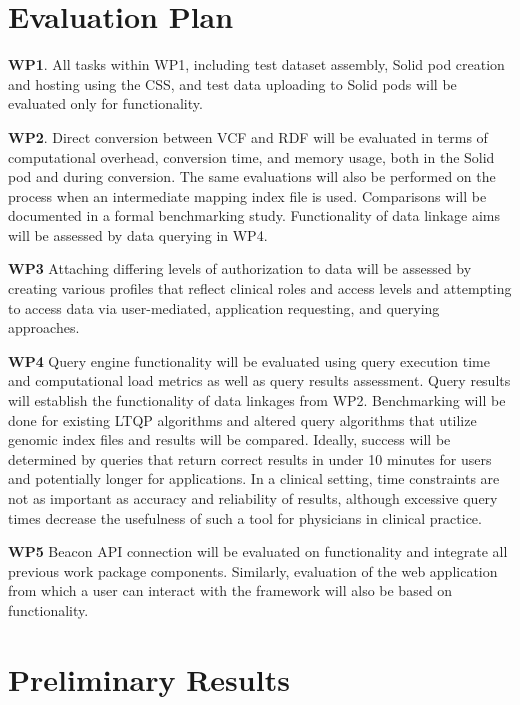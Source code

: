 \documentclass[runningheads]{llncs}
\begin{document}
\section{Evaluation Plan}
\begin{comment}
Describe your evaluation or evaluation plan, which is the way you (intend to) validate your hypothesis, your results, and the value of your approach.
\end{comment}

\textbf{WP1}.
All tasks within WP1, including test dataset assembly, Solid pod creation and hosting using the CSS, and test data uploading to Solid pods will be evaluated only for functionality.

\textbf{WP2}.
Direct conversion between VCF and RDF will be evaluated in terms of computational overhead, conversion time, and memory usage, both in the Solid pod and during conversion.
The same evaluations will also be performed on the process when an intermediate mapping index file is used. 
Comparisons will be documented in a formal benchmarking study.
Functionality of data linkage aims will be assessed by data querying in WP4.

\textbf{WP3}
Attaching differing levels of authorization to data will be assessed by creating various profiles that reflect clinical roles and access levels and attempting to access data via user-mediated, application requesting, and querying approaches. 

\textbf{WP4}
Query engine functionality will be evaluated using query execution time and computational load metrics as well as query results assessment. 
Query results will establish the functionality of data linkages from WP2.
Benchmarking will be done for existing LTQP algorithms and altered query algorithms that utilize genomic index files and results will be compared.
Ideally, success will be determined by queries that return correct results in under 10 minutes for users and potentially longer for applications.
In a clinical setting, time constraints are not as important as accuracy and reliability of results, although excessive query times decrease the usefulness of such a tool for physicians in clinical practice.

\textbf{WP5}
Beacon API connection will be evaluated on functionality and integrate all previous work package components. 
Similarly, evaluation of the web application from which a user can interact with the framework will also be based on functionality.


\section{Preliminary Results}
\begin{comment}
Results: Report the results achieved up to now in applying your approach in this section. Preliminary results are fine.
\end{comment}
\end{document}
